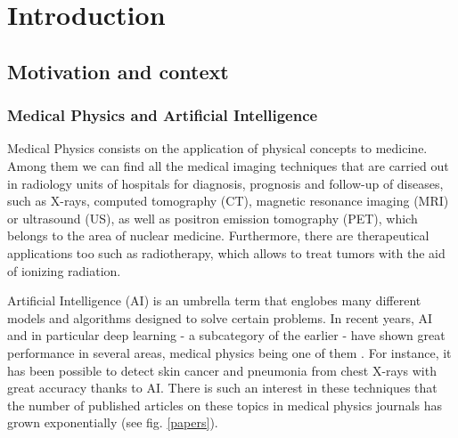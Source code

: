\documentclass[12pt]{article} %
\begin{document}
\newpage



\tableofcontents
\newpage


\normalsize

\section{Introduction}

\subsection{Motivation and context}

\subsubsection{Medical Physics and Artificial Intelligence}
	
	Medical Physics consists on the application of physical concepts to medicine. Among them we can find all the medical imaging techniques that are carried out in radiology units of hospitals for diagnosis, prognosis and follow-up of diseases, such as X-rays, computed tomography (CT), magnetic resonance imaging (MRI) or ultrasound (US), as well as positron emission tomography (PET), which belongs to the area of nuclear medicine. Furthermore, there are therapeutical applications too such as radiotherapy, which allows to treat tumors with the aid of ionizing radiation.
	
	Artificial Intelligence (AI) is an umbrella term that englobes many different models and algorithms designed to solve certain problems. In recent years, AI and in particular deep learning - a subcategory of the earlier - have shown great performance in several areas, medical physics being one of them \cite{shen}. For instance, it has been possible to detect skin cancer \cite{esteva} and pneumonia from chest X-rays \cite{rajpurkar} with great accuracy thanks to AI. There is such an interest in these techniques that the number of published articles on these topics in medical physics journals has grown exponentially (see fig. \ref{papers}).
	
\end{document}
